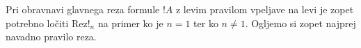 \dol
\begin{prooftree}


\end{prooftree}
Pri obravnavi glavnega reza formule $!A$ z levim pravilom vpeljave na levi je zopet potrebno ločiti Rez!$_n$ na primer ko je $n=1$ ter ko $n\neq1$. Ogljemo si zopet najprej navadno pravilo reza.
\begin{prooftree}


\end{prooftree}
\dol
\begin{prooftree}
\end{prooftree}
